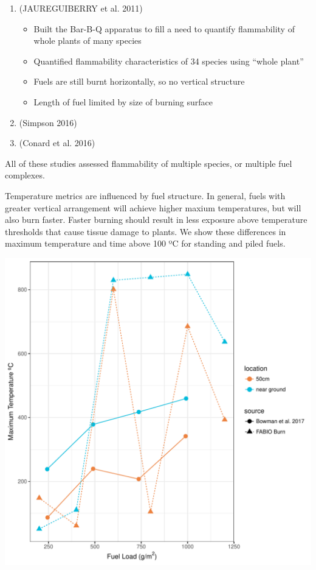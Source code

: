 \documentclass[11pt,a4paper]{article}
\begin{document}
\begin{enumerate}
\def\labelenumi{\arabic{enumi}.}
\item
  (JAUREGUIBERRY et al. 2011)

  \begin{itemize}
  \item
    Built the Bar-B-Q apparatus to fill a need to quantify flammability
    of whole plants of many species
  \item
    Quantified flammability characteristics of 34 species using ``whole
    plant''
  \item
    Fuels are still burnt horizontally, so no vertical structure
  \item
    Length of fuel limited by size of burning surface
  \end{itemize}
\item
  (Simpson 2016)
\item
  (Conard et al. 2016)
\end{enumerate}

All of these studies assessed flammability of multiple species, or
multiple fuel complexes.

Temperature metrics are influenced by fuel structure. In general, fuels
with greater vertical arrangement will achieve higher maxium
temperatures, but will also burn faster. Faster burning should result in
less exposure above temperature thresholds that cause tissue damage to
plants. We show these differences in maximum temperature and time above
100 ºC for standing and piled fuels.

\includegraphics{figures/compare_maxtemp-1.pdf}
\end{document}
